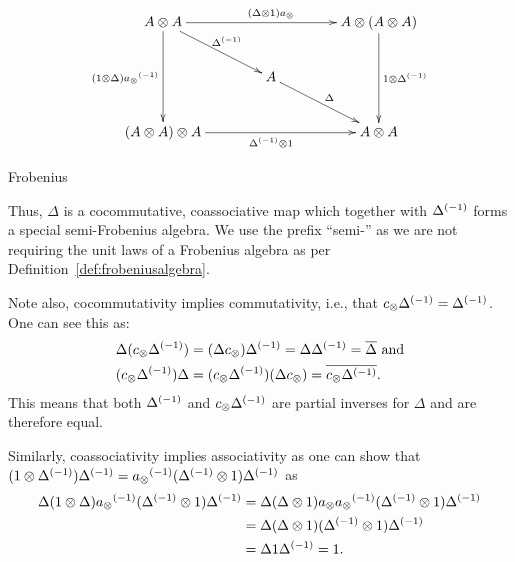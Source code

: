 \begin{definition}
  \[
    \xymatrix @C=40pt @R=25pt{
      A \* A \ar[dd]_{(1\*\Delta) \inv{a_{\*}}} \ar[dr]^{\inv{\Delta}}
      \ar[rr]^{(\Delta \* 1) a_{\*}} & &
      A \* (A \* A) \ar[dd]^{1 \* \inv{\Delta}}\\
      & A \ar[dr]^{\Delta} & \\
      (A \* A) \* A \ar[rr]_{\inv{\Delta} \* 1} & &
      A \* A
    }
  \]
\begin{center}Frobenius\end{center}


  Thus, $\Delta$ is a cocommutative, coassociative map which together with ${\Delta}^{(-1)}$ forms a
  special semi-Frobenius algebra. We use the prefix ``semi-'' as we are not requiring the unit laws
  of a Frobenius algebra as per Definition~\ref{def:frobeniusalgebra}.
\end{definition}

\begin{remark}
  Note also, cocommutativity implies commutativity, i.e., that $c_{\otimes}{\Delta}^{(-1)} = {\Delta}^{(-1)}$.
  One can see this as:
  \begin{align*}
    \Delta(c_{\otimes}{\Delta}^{(-1)})
      &= (\Delta c_{\otimes}){\Delta}^{(-1)} = \Delta{\Delta}^{(-1)} = \overline{\Delta} \text{ and}\\
    (c_{\otimes}{\Delta}^{(-1)})\Delta
      & = (c_{\otimes}{\Delta}^{(-1)})(\Delta c_{\otimes}) = \overline{c_{\otimes}{\Delta}^{(-1)}}.
  \end{align*}
  This means that both ${\Delta}^{(-1)}$ and $c_{\otimes}{\Delta}^{(-1)}$ are partial inverses for $\Delta$
  and are therefore equal.

  Similarly, coassociativity implies associativity as one can show that
  $(1\otimes{\Delta}^{(-1)}){\Delta}^{(-1)} =  {a_{\otimes}}^{(-1)}({\Delta}^{(-1)}\otimes 1){\Delta}^{(-1)}$ as
  \begin{align*}
    \Delta(1\otimes\Delta){a_{\otimes}}^{(-1)}({\Delta}^{(-1)}\otimes 1){\Delta}^{(-1)} &=
    \Delta(\Delta\otimes1)a_{\otimes}{a_{\otimes}}^{(-1)}({\Delta}^{(-1)}\otimes 1){\Delta}^{(-1)} \\
    & =\Delta(\Delta\otimes1)({\Delta}^{(-1)}\otimes 1){\Delta}^{(-1)} \\
    & =\Delta 1{\Delta}^{(-1)} = 1.
  \end{align*}
\end{remark}

